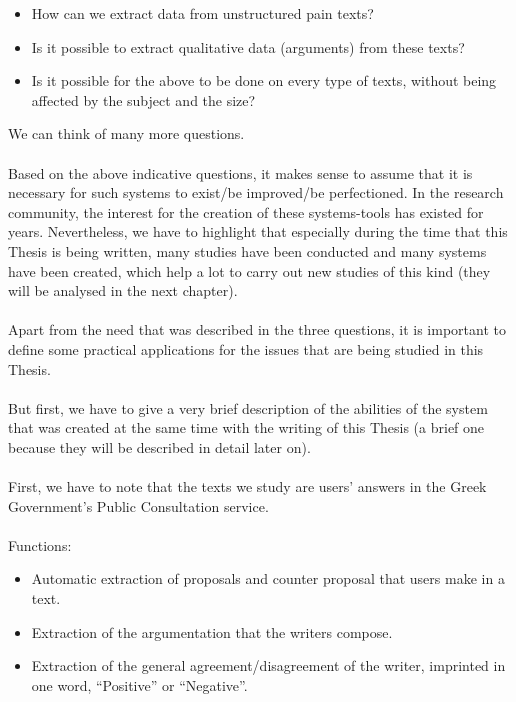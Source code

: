 \begin{itemize}

	\item How can we extract data from unstructured pain texts?
	\item Is it possible to extract qualitative data (arguments) from these texts?
	\item Is it possible for the above to be done on every type of texts, without being affected by the subject and the size?\\

\end{itemize}

We can think of many more questions.\\
\\
Based on the above indicative questions, it makes sense to assume that it is necessary for such systems to exist/be improved/be perfectioned. In the research community, the interest for the creation of these  systems-tools has existed for years. Nevertheless, we have to  highlight that especially during the time that this Thesis is being written, many studies have been conducted and many systems have been created, which help a lot to carry out new studies of this kind (they will be analysed in the next chapter).\\
\\
Apart from the need that was described in the three questions, it is important to define some practical applications for the issues that are being studied in this Thesis.\\
\\
But first, we have to give a very brief description of the abilities of the system that was created at the same time with the writing of this Thesis (a brief one because they will be described in detail later on).\\
\\
First, we have to note that the texts we study are users' answers in the Greek Government's Public Consultation service.\\
\\
Functions:\\

\begin{itemize}

	\item Automatic extraction of proposals and counter proposal that users make in a text.
	\item Extraction of the argumentation that the writers compose.
	\item Extraction of the general agreement/disagreement of the writer, imprinted in one word, ``Positive'' or ``Negative''.\\

\end{itemize}

